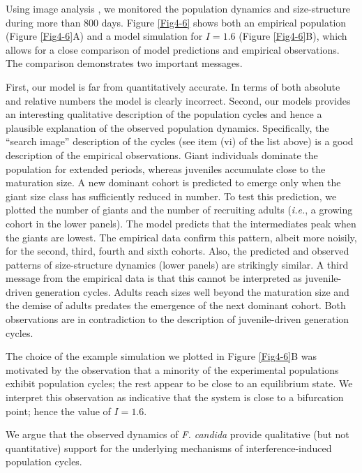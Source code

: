 Using image analysis \autocites{mallard2012a,mallard2013a}, we monitored the
population dynamics and size-structure during more than $800$ days. Figure
\ref{Fig4-6} shows both an empirical population (Figure \ref{Fig4-6}A) and a
model simulation for $I = 1.6$ (Figure \ref{Fig4-6}B), which allows for a close
comparison of model predictions and empirical observations. The comparison
demonstrates two important messages.

First, our model is far from quantitatively accurate. In terms of both absolute
and relative numbers the model is clearly incorrect. Second, our models provides
an interesting qualitative description of the population cycles and hence a
plausible explanation of the observed population dynamics. Specifically, the
“search image” description of the cycles (see item (vi) of the list above) is a
good description of the empirical observations. Giant individuals dominate the
population for extended periods, whereas juveniles accumulate close to the
maturation size. A new dominant cohort is predicted to emerge only when the
giant size class has sufficiently reduced in number. To test this prediction, we
plotted the number of giants and the number of recruiting adults (\textit{i.e.},
a growing cohort in the lower panels). The model predicts that the intermediates
peak when the giants are lowest. The empirical data confirm this pattern, albeit
more noisily, for the second, third, fourth and sixth cohorts. Also, the
predicted and observed patterns of size-structure dynamics (lower panels) are
strikingly similar. A third message from the empirical data is that this cannot
be interpreted as juvenile-driven generation cycles. Adults reach sizes well
beyond the maturation size and the demise of adults predates the emergence of
the next dominant cohort. Both observations are in contradiction to the
description of juvenile-driven generation cycles.

The choice of the example simulation we plotted in Figure \ref{Fig4-6}B was
motivated by the observation that a minority of the experimental populations exhibit
population cycles; the rest appear to be close to an equilibrium state. We
interpret this observation as indicative that the system is close to a
bifurcation point; hence the value of $I = 1.6$.

We argue that the observed dynamics of \textit{F. candida} provide qualitative
(but not quantitative) support for the underlying mechanisms of
interference-induced population cycles.

